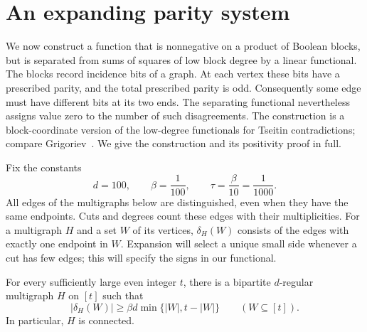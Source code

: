 \section{An expanding parity system}
\label{sec:parity}

We now construct a function that is nonnegative on a product of Boolean
blocks, but is separated from sums of squares of low block degree by a
linear functional.  The blocks record incidence bits of a graph.  At each
vertex these bits have a prescribed parity, and the total prescribed parity
is odd.  Consequently some edge must have different bits at its two ends.
The separating functional nevertheless assigns value zero to the number of
such disagreements.  The construction is a block-coordinate version of the
low-degree functionals for Tseitin contradictions; compare
Grigoriev~\cite{grigoriev}.  We give the construction and its positivity
proof in full.

Fix the constants
\begin{equation}
  d=100,\qquad \beta=\frac1{100},\qquad
  \tau=\frac{\beta}{10}=\frac1{1000}.
  \label{eq:parity-constants}
\end{equation}
All edges of the multigraphs below are distinguished, even when they have
the same endpoints.  Cuts and degrees count these edges with their
multiplicities.  For a multigraph \(H\) and a set \(W\) of its vertices,
\(\delta_H(W)\) consists of the edges with exactly one endpoint in \(W\).
Expansion will select a unique small side whenever a cut has few edges;
this will specify the signs in our functional.

\begin{lemma}
  \label{lem:expander}
  For every sufficiently large even integer \(t\), there is a bipartite
  \(d\)-regular multigraph \(H\) on \([t]\) such that
  \begin{equation}
    |\delta_H(W)|\geq \beta d\min\{|W|,t-|W|\}
    \qquad (W\subseteq[t]).
    \label{eq:parity-expansion}
  \end{equation}
  In particular, \(H\) is connected.
\end{lemma}

